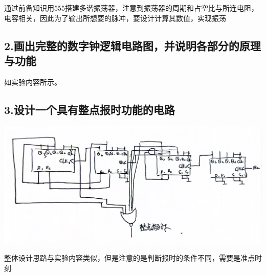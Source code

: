 \documentclass{ctexart}
\begin{document}
    通过前备知识用555搭建多谐振荡器，注意到振荡器的周期和占空比与所连电阻，电容相关，因此为了输出所想要的脉冲，要设计计算其数值，实现振荡

    \subsection*{2.画出完整的数字钟逻辑电路图，并说明各部分的原理与功能}
     如实验内容所示。

     \subsection*{3.设计一个具有整点报时功能的电路}
       \begin{minipage}[c]{\textwidth}
        \centering
        \includegraphics[width=\linewidth]{4.2.png} 
    \end{minipage}

    整体设计思路与实验内容类似，但是注意的是判断报时的条件不同，需要是准点时刻
\end{document}
